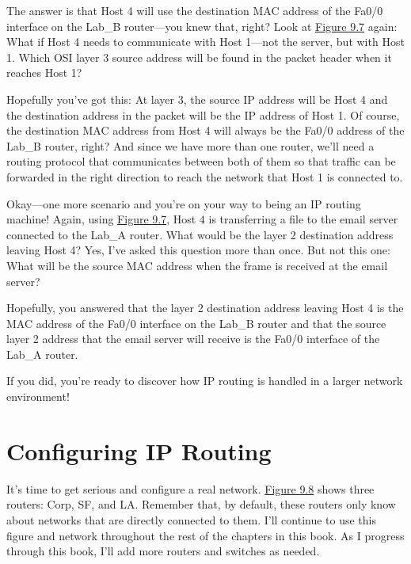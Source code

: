 The answer is that Host 4 will use the destination MAC address of the
Fa0/0 interface on the Lab\_B router---you knew that, right? Look at
\protect\hyperlink{c09.xhtmlux5cux23figure9-7}{Figure 9.7} again: What
if Host 4 needs to communicate with Host 1---not the server, but with
Host 1. Which OSI layer 3 source address will be found in the packet
header when it reaches Host 1?

Hopefully you've got this: At layer 3, the source IP address will be
Host 4 and the destination address in the packet will be the IP address
of Host 1. Of course, the destination MAC address from Host 4 will
always be the Fa0/0 address of the Lab\_B router, right? And since we
have more than one router, we'll need a routing protocol that
communicates between both of them so that traffic can be forwarded in
the right direction to reach the network that Host 1 is connected to.

Okay---one more scenario and you're on your way to being an IP routing
machine! Again, using
\protect\hyperlink{c09.xhtmlux5cux23figure9-7}{Figure 9.7}, Host 4 is
transferring a file to the email server connected to the Lab\_A router.
What would be the layer 2 destination address leaving Host 4? Yes, I've
asked this question more than once. But not this one: What will be the
source MAC address when the frame is received at the email server?

\protect\hypertarget{c09.xhtmlux5cux23Page_372}{}{}Hopefully, you
answered that the layer 2 destination address leaving Host 4 is the MAC
address of the Fa0/0 interface on the Lab\_B router and that the source
layer 2 address that the email server will receive is the Fa0/0
interface of the Lab\_A router.

If you did, you're ready to discover how IP routing is handled in a
larger network environment!




\section{Configuring IP Routing}

It's time to get serious and configure a real network.
\protect\hyperlink{c09.xhtmlux5cux23figure9-8}{Figure 9.8} shows three
routers: Corp, SF, and LA. Remember that, by default, these routers only
know about networks that are directly connected to them. I'll continue
to use this figure and network throughout the rest of the chapters in
this book. As I progress through this book, I'll add more routers and
switches as needed.

